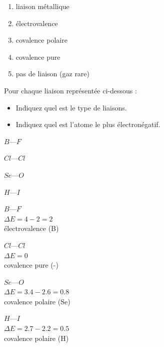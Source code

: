 \documentclass[
  11pt,
  french,
  a4paper,
  openany]{book}
\providecommand{\tightlist}{%
  \setlength{\itemsep}{0pt}\setlength{\parskip}{0pt}}
\begin{document}
\begin{Answer}

\begin{enumerate}
\def\labelenumi{\alph{enumi}.}
\tightlist
\item
  liaison métallique
\item
  électrovalence
\item
  covalence polaire
\item
  covalence pure
\item
  pas de liaison (gaz rare)
\end{enumerate}


\end{Answer}

\newpage

\begin{Exercise}

Pour chaque liaison représentée ci-dessous :

\begin{itemize}
\tightlist
\item
  Indiquez quel est le type de liaisons.
\item
  Indiquez quel est l'atome le plus électronégatif.
\end{itemize}

\begin{multicols}{4}
\(B—F\)

\(Cl—Cl\)

\(Se—O\)

\(H—I\)

\end{multicols}



\end{Exercise}

\begin{Answer}

\begin{multicols}{2}
\(B—F\)\\
\(\Delta E = 4 - 2 = 2\)\\
électrovalence (B)

\(Cl—Cl\)\\
\(\Delta E = 0\)\\
covalence pure (-)

\(Se—O\)\\
\(\Delta E = 3.4 - 2.6 = 0.8\)\\
covalence polaire (Se)

\(H—I\)\\
\(\Delta E = 2.7 - 2.2 = 0.5\)\\
covalence polaire (H)

\end{multicols}


\end{Answer}
\end{document}
